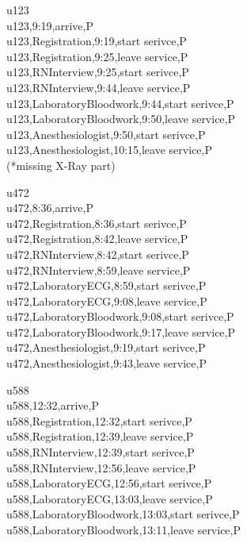 \documentclass[12pt]{article}
\begin{document}
\quad

u123\\

u123,9:19,arrive,P\\
u123,Registration,9:19,start serivce,P\\
u123,Registration,9:25,leave service,P\\
u123,RNInterview,9:25,start serivce,P\\
u123,RNInterview,9:44,leave service,P\\
u123,LaboratoryBloodwork,9:44,start serivce,P\\
u123,LaboratoryBloodwork,9:50,leave service,P\\
u123,Anesthesiologist,9:50,start serivce,P\\
u123,Anesthesiologist,10:15,leave service,P\\

(*missing X-Ray part)

\quad

u472\\

u472,8:36,arrive,P\\
u472,Registration,8:36,start serivce,P\\
u472,Registration,8:42,leave service,P\\
u472,RNInterview,8:42,start serivce,P\\
u472,RNInterview,8:59,leave service,P\\
u472,LaboratoryECG,8:59,start serivce,P\\
u472,LaboratoryECG,9:08,leave service,P\\
u472,LaboratoryBloodwork,9:08,start serivce,P\\
u472,LaboratoryBloodwork,9:17,leave service,P\\
u472,Anesthesiologist,9:19,start serivce,P\\
u472,Anesthesiologist,9:43,leave service,P\\

\quad

u588\\

u588,12:32,arrive,P\\
u588,Registration,12:32,start serivce,P\\
u588,Registration,12:39,leave service,P\\
u588,RNInterview,12:39,start serivce,P\\
u588,RNInterview,12:56,leave service,P\\
u588,LaboratoryECG,12:56,start serivce,P\\
u588,LaboratoryECG,13:03,leave service,P\\
u588,LaboratoryBloodwork,13:03,start serivce,P\\
u588,LaboratoryBloodwork,13:11,leave service,P\\
\end{document}
